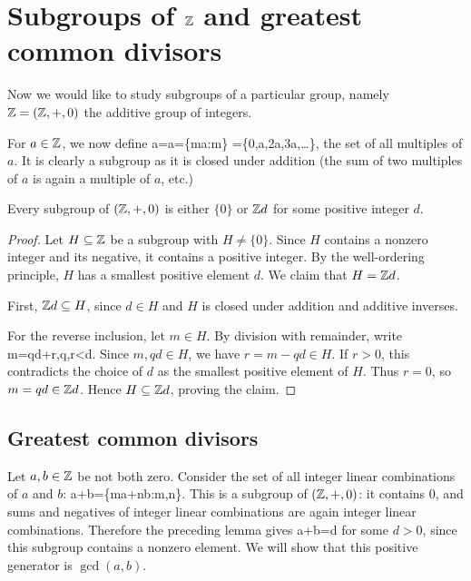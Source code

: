 \documentclass[reqno,11pt]{amsart}
\begin{document}
\section{Subgroups of \texorpdfstring{$\mathbb{Z}$}{Z} and greatest common divisors}

Now we would like to study subgroups of a particular group, namely $\mathbb{Z}=(\mathbb{Z}, +, 0)$ the additive group of integers. 

For $a\in\mathbb{Z}$, we now define
	\be
	\Z a=\langle a\rangle=\{ma:m\in\Z\}
	=\{0,\pm a,\pm2a,\pm3a,\ldots\},
	\ee
	the set of all multiples of $a$. 
It is clearly a subgroup as it is closed under addition (the sum of two multiples of $a$ is again a multiple of $a$, etc.)


\begin{lemma}
	Every subgroup of $(\mathbb{Z},+,0)$ is either $\{0\}$ or $\mathbb{Z} d$ for some
	positive integer $d$.
\end{lemma}

\begin{proof}
	Let $H\subseteq\mathbb{Z}$ be a subgroup with $H\neq\{0\}$. Since $H$ contains
	a nonzero integer and its negative, it contains a positive integer.
	By the well-ordering principle, $H$ has a smallest positive element $d$.
	We claim that $H=\mathbb{Z} d$.

	First, $\mathbb{Z} d\subseteq H$, since $d\in H$ and $H$ is closed under
	addition and additive inverses.

	For the reverse inclusion, let $m\in H$. By division with remainder,
	write
	\be
	m=qd+r,\qquad q\in\Z,\leq r<d.
	\ee
	Since $m,qd\in H$, we have $r=m-qd\in H$. If $r>0$, this contradicts
	the choice of $d$ as the smallest positive element of $H$. Thus $r=0$,
	so $m=qd\in\mathbb{Z} d$. Hence $H\subseteq\mathbb{Z} d$, proving the claim.
\end{proof}

\subsection*{Greatest common divisors}

Let $a,b\in\mathbb{Z}$ be not both zero. Consider the set of all integer linear combinations
of $a$ and $b$:
\be
\Z a+\Z b=\{ma+nb:m,n\in\Z\}.
\ee
This is a subgroup of $(\mathbb{Z},+,0)$: it contains $0$, and sums and negatives
of integer linear combinations are again integer linear combinations.
Therefore the preceding lemma gives
\be
\Z a+\Z b=\Z d
\ee
for some $d>0$, since this subgroup contains a nonzero element.
We will show that this positive generator is $\gcd(a,b)$.
\end{document}
